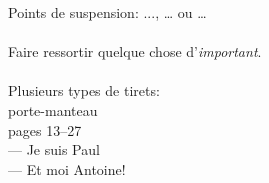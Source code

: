 Points de suspension: ..., …
ou \ldots
\\
\\
Faire ressortir quelque chose
d'\emph{important}.
\\
\\
Plusieurs types de tirets:\\
porte-manteau\\
pages 13--27\\
--- Je suis Paul\\
--- Et moi Antoine!
